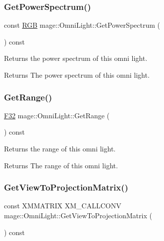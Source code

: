 \subsubsection{\texorpdfstring{Get\+Power\+Spectrum()}{GetPowerSpectrum()}}
{\footnotesize\ttfamily const \hyperlink{structmage_1_1_r_g_b}{R\+GB} mage\+::\+Omni\+Light\+::\+Get\+Power\+Spectrum (\begin{DoxyParamCaption}{ }\end{DoxyParamCaption}) const\hspace{0.3cm}{\ttfamily [noexcept]}}

Returns the power spectrum of this omni light.

\begin{DoxyReturn}{Returns}
The power spectrum of this omni light. 
\end{DoxyReturn}
\hypertarget{classmage_1_1_omni_light_a1c829777c2afc850dd66382bc0115d8d}{}\label{classmage_1_1_omni_light_a1c829777c2afc850dd66382bc0115d8d} 
\subsubsection{\texorpdfstring{Get\+Range()}{GetRange()}}
{\footnotesize\ttfamily \hyperlink{namespacemage_aa97e833b45f06d60a0a9c4fc22ae02c0}{F32} mage\+::\+Omni\+Light\+::\+Get\+Range (\begin{DoxyParamCaption}{ }\end{DoxyParamCaption}) const\hspace{0.3cm}{\ttfamily [noexcept]}}

Returns the range of this omni light.

\begin{DoxyReturn}{Returns}
The range of this omni light. 
\end{DoxyReturn}
\hypertarget{classmage_1_1_omni_light_abae044c80634cfc6d15a0e21e7a55b5d}{}\label{classmage_1_1_omni_light_abae044c80634cfc6d15a0e21e7a55b5d} 
\subsubsection{\texorpdfstring{Get\+View\+To\+Projection\+Matrix()}{GetViewToProjectionMatrix()}}
{\footnotesize\ttfamily const X\+M\+M\+A\+T\+R\+IX X\+M\+\_\+\+C\+A\+L\+L\+C\+O\+NV mage\+::\+Omni\+Light\+::\+Get\+View\+To\+Projection\+Matrix (\begin{DoxyParamCaption}{ }\end{DoxyParamCaption}) const\hspace{0.3cm}{\ttfamily [noexcept]}}


